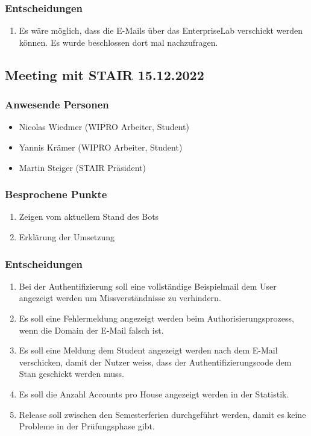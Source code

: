 \documentclass[a4paper, table]{article}
\begin{document}
\subsubsection*{Entscheidungen}

\begin{enumerate}
    \item Es wäre möglich, dass die E-Mails über das EnterpriseLab verschickt werden können. Es wurde beschlossen dort mal nachzufragen.
\end{enumerate}

\newpage
\subsection{Meeting mit STAIR 15.12.2022}

\subsubsection*{Anwesende Personen}

\begin{itemize}
    \item Nicolas Wiedmer (WIPRO Arbeiter, Student)
    \item Yannis Krämer (WIPRO Arbeiter, Student)
    \item Martin Steiger (STAIR Präsident)
\end{itemize}

\subsubsection*{Besprochene Punkte}

\begin{enumerate}
    \item Zeigen vom aktuellem Stand des Bots
    \item Erklärung der Umsetzung
\end{enumerate}

\subsubsection*{Entscheidungen}

\begin{enumerate}
    \item Bei der Authentifizierung soll eine vollständige Beispielmail dem User angezeigt werden um Missverständnisse zu verhindern.
    \item Es soll eine Fehlermeldung angezeigt werden beim Authorisierungsprozess, wenn die Domain der E-Mail falsch ist.
    \item Es soll eine Meldung dem Student angezeigt werden nach dem E-Mail verschicken, damit der Nutzer weiss, dass der Authentifizierungscode dem Stan geschickt werden muss.
    \item Es soll die Anzahl Accounts pro House angezeigt werden in der Statistik.
    \item Release soll zwischen den Semesterferien durchgeführt werden, damit es keine Probleme in der Prüfungsphase gibt.
\end{enumerate}
\end{document}
